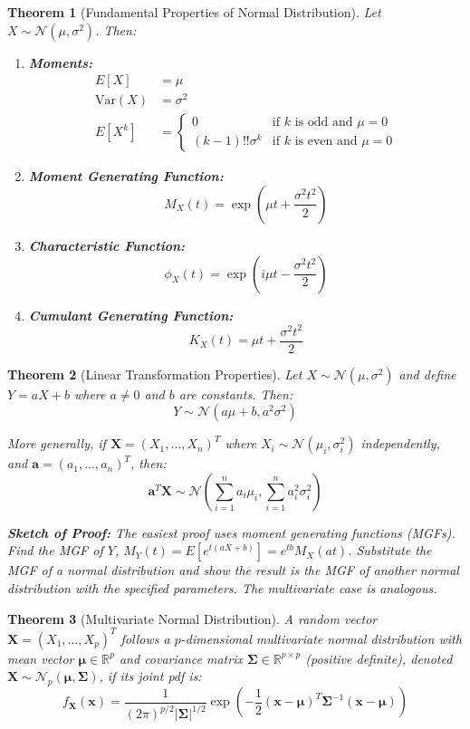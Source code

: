 \documentclass[12pt,a4paper]{article}
\newtheorem{theorem}{Theorem}[section]
\theoremstyle{remark}
\begin{document}
\begin{theorem}[Fundamental Properties of Normal Distribution]
Let $X \sim \mathcal{N}(\mu, \sigma^2)$. Then:
\begin{enumerate}
\item \textbf{Moments:} 
   \begin{align}
   E[X] &= \mu\\
   \text{Var}(X) &= \sigma^2\\
   E[X^k] &= \begin{cases}
   0 & \text{if } k \text{ is odd and } \mu = 0\\
   (k-1)!! \sigma^k & \text{if } k \text{ is even and } \mu = 0
   \end{cases}
   \end{align}
\item \textbf{Moment Generating Function:} 
   $$M_X(t) = \exp(\mu t + \frac{\sigma^2 t^2}{2})$$
\item \textbf{Characteristic Function:} 
   $$\phi_X(t) = \exp(i\mu t - \frac{\sigma^2 t^2}{2})$$
\item \textbf{Cumulant Generating Function:} 
   $$K_X(t) = \mu t + \frac{\sigma^2 t^2}{2}$$
\end{enumerate}
\end{theorem}

\begin{theorem}[Linear Transformation Properties]
Let $X \sim \mathcal{N}(\mu, \sigma^2)$ and define $Y = aX + b$ where $a \neq 0$ and $b$ are constants. Then:
$$Y \sim \mathcal{N}(a\mu + b, a^2\sigma^2)$$

More generally, if $\mathbf{X} = (X_1, \ldots, X_n)^T$ where $X_i \sim \mathcal{N}(\mu_i, \sigma_i^2)$ independently, and $\mathbf{a} = (a_1, \ldots, a_n)^T$, then:
$$\mathbf{a}^T\mathbf{X} \sim \mathcal{N}\left(\sum_{i=1}^n a_i\mu_i, \sum_{i=1}^n a_i^2\sigma_i^2\right)$$

\textbf{Sketch of Proof:} The easiest proof uses moment generating functions (MGFs). Find the MGF of $Y$, $M_Y(t) = E[e^{t(aX+b)}] = e^{tb}M_X(at)$. Substitute the MGF of a normal distribution and show the result is the MGF of another normal distribution with the specified parameters. The multivariate case is analogous.
\end{theorem}

\begin{theorem}[Multivariate Normal Distribution]
A random vector $\mathbf{X} = (X_1, \ldots, X_p)^T$ follows a $p$-dimensional multivariate normal distribution with mean vector $\boldsymbol{\mu} \in \mathbb{R}^p$ and covariance matrix $\boldsymbol{\Sigma} \in \mathbb{R}^{p \times p}$ (positive definite), denoted $\mathbf{X} \sim \mathcal{N}_p(\boldsymbol{\mu}, \boldsymbol{\Sigma})$, if its joint pdf is:
$$f_{\mathbf{X}}(\mathbf{x}) = \frac{1}{(2\pi)^{p/2}|\boldsymbol{\Sigma}|^{1/2}} \exp\left(-\frac{1}{2}(\mathbf{x} - \boldsymbol{\mu})^T\boldsymbol{\Sigma}^{-1}(\mathbf{x} - \boldsymbol{\mu})\right)$$
\end{theorem}
\end{document}
